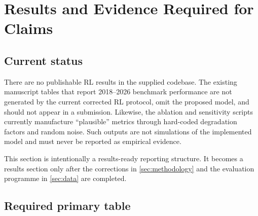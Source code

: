 \section{Results and Evidence Required for Claims}
\label{sec:results}

\subsection{Current status}

There are no publishable RL results in the supplied codebase. The existing manuscript tables that report 2018--2026 benchmark performance are not generated by the current corrected RL protocol, omit the proposed model, and should not appear in a submission. Likewise, the ablation and sensitivity scripts currently manufacture ``plausible'' metrics through hard-coded degradation factors and random noise. Such outputs are not simulations of the implemented model and must never be reported as empirical evidence.

This section is intentionally a results-ready reporting structure. It becomes a results section only after the corrections in \cref{sec:methodology} and the evaluation programme in \cref{sec:data} are completed.

\subsection{Required primary table}

